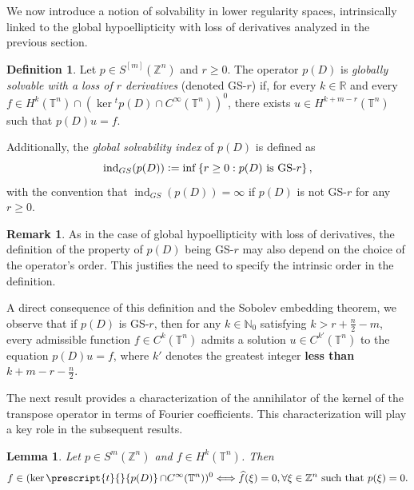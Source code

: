 \documentclass[11pt]{amsart}
\numberwithin{equation}{section}
\newtheorem{lemma}[theorem]{Lemma}
\theoremstyle{definition}
\newtheorem{definition}[theorem]{Definition}
\newtheorem{remark}[theorem]{Remark}
\DeclareMathOperator{\pt}{\mathnormal{\prescript{t}{}{p(D)}}}
\begin{document}
	We now introduce a notion of solvability in lower regularity spaces, intrinsically linked to the global hypoellipticity with loss of derivatives analyzed in the previous section.
	
	\begin{definition}\label{def_GS}
		Let \( p \in S^{[m]}(\mathbb{Z}^n) \) and \( r \geq 0 \). The operator \( p(D) \) is \textit{globally solvable with a loss of \( r \) derivatives} (denoted GS-\( r \)) if, for every \( k \in \mathbb{R} \) and every \( f \in H^k(\mathbb{T}^n) \cap \left( \ker {}^t p(D) \cap C^\infty(\mathbb{T}^n) \right)^0 \), there exists \( u \in H^{k + m - r}(\mathbb{T}^n) \) such that \( p(D)u = f \).
		
		Additionally, the \textit{global solvability index} of \( p(D) \) is defined as
		\[
		\operatorname{ind}_{GS}(p(D)) \vcentcolon= \inf \left\{ r \geq 0 : p(D) \text{ is GS-}r \right\},
		\]
		with the convention that \( \operatorname{ind}_{GS}(p(D)) = \infty \) if \( p(D) \) is not GS-\( r \) for any \( r \geq 0 \).
	\end{definition}


	\begin{remark}
		As in the case of global hypoellipticity with loss of derivatives, the definition of the property of \( p(D) \) being GS-\( r \) may also depend on the choice of the operator's order. This justifies the need to specify the intrinsic order in the definition.
		
		A direct consequence of this definition and the Sobolev embedding theorem, we observe that if \( p(D) \) is GS-\( r \), then for any \( k \in \mathbb{N}_0 \) satisfying \( k >r+\frac{n}{2}-m \), every admissible function \( f \in C^k(\mathbb{T}^n) \) admits a solution \( u \in C^{k'}(\mathbb{T}^n) \) to the equation \( p(D)u = f \),  where $k'$ denotes the greatest integer {\bf less than} $k+m-r-\frac{n}{2}$.
	\end{remark}
	
	The next result provides a characterization of the annihilator of the kernel of the transpose operator in terms of Fourier coefficients. This characterization will play a key role in the subsequent results.
	
	\begin{lemma}\label{equivalence_ker0}
		Let \( p \in S^{m}(\mathbb{Z}^n) \) and \( f \in H^k(\mathbb{T}^n) \). Then  
		\[
		f \in (\ker \pt \cap C^\infty(\mathbb{T}^n))^0  \Longleftrightarrow  \widehat{f}(\xi) = 0,  \forall \xi \in \mathbb{Z}^n \text{ such that } p(\xi) = 0.
		\]
	\end{lemma}
\end{document}

